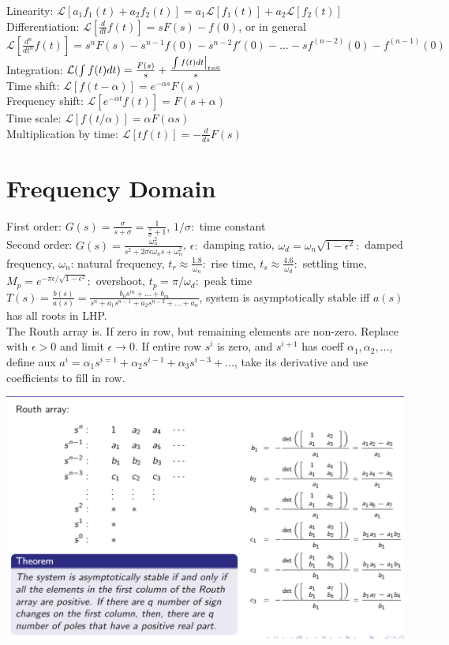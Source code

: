 \documentclass[11pt]{article}
\begin{document}
Linearity: $\mathcal{L}[a_1 f_1(t) + a_2 f_2(t)] = a_1 \mathcal{L}[f_1(t)] + a_2 \mathcal{L}[f_2(t)]$\\
Differentiation: $\mathcal{L}[\frac{d}{dt} f(t)] = sF(s) - f(0)$, or in general
$\mathcal{L}[\frac{d^n}{dt^n} f(t)] = s^nF(s) - s^{n-1}f(0) - s^{n-2}f'(0) - \dots - s f^{(n-2)}(0) - f^{(n-1)}(0)$\\
Integration: $\mathcal{L}(\int f(t)dt) = \frac{F(s)}{s} + \frac{\left.\int f(t)dt\right\rvert_{t=0}^{}}{s}$\\
Time shift: $\mathcal{L}[f(t-\alpha)] = e^{-\alpha s}F(s)$\\
Frequency shift: $\mathcal{L}[e^{-\alpha t}f(t)] = F(s + \alpha)$\\
Time scale: $\mathcal{L}[f(t/\alpha)] = \alpha F (\alpha s)$\\
Multiplication by time: $\mathcal{L}[tf(t)] = - \frac{d}{ds}F(s)$\\


\section{Frequency Domain}
First order: $G(s) = \frac{\sigma}{s + \sigma} = \frac{1}{\frac{s}{\sigma}+1}$, $1/\sigma:$ time constant\\
Second order: $G(s) = \frac{\omega_n^2}{s^2 + 2 \sigma \epsilon \omega_n s + \omega_n ^2}$, $\epsilon:$ damping ratio, $\omega_d =\omega_n\sqrt{1 - \epsilon^2}:$ damped frequency, $\omega_n$: natural frequency,
$t_r \approx \frac{1.8}{\omega_n}:$ rise time, $t_s \approx \frac{4.6}{\omega_d}:$ settling time, $M_p = e^{-\pi \epsilon / \sqrt{1 - \epsilon^2}}:$ overshoot, $t_p = \pi/\omega_d:$ peak time\\

$T(s) = \frac{b(s)}{a(s)} = \frac{b_0 s^m + \dots + b_m}{s^n + a_1s^{n-1} + a_2 s^{n-2} + \dots + a_n}$, system is asymptotically stable iff $a(s)$ has all roots in LHP.\\
The Routh array is.
If zero in row, but remaining elements are non-zero. Replace with $\epsilon > 0$ and limit $\epsilon \to 0$.
If entire row $s^i$ is zero, and $s^{i+1}$ has coeff $\alpha_1, \alpha_2, \dots$, define aux $a^i = \alpha_1 s^{i=1} + \alpha_2 s^{i-1} + \alpha_3 s^{i-3} + \dots$,
take its derivative and use coefficients to fill in row.\\
\begin{center}
    \includegraphics[width=0.99 \linewidth]{routh.png}
\end{center}
\end{document}

